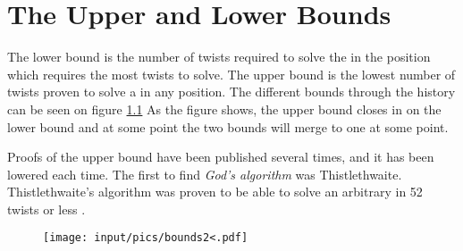 \chapter{The Upper and Lower Bounds}

The lower bound is the number of twists required to solve the \rubik{} in the position which requires the most twists to solve.
The upper bound is the lowest number of twists proven to solve a \rubik{} in any position.
The different bounds through the history can be seen on figure \ref{fig:upperLowerBound}
As the figure shows, the upper bound closes in on the lower bound and at some point the two bounds will merge to one at some point.

Proofs of the upper bound have been published several times, and it has been lowered each time.
The first to find \textit{God's algorithm} was Thistlethwaite. Thistlethwaite's algorithm was proven to be able to solve an arbitrary \rubik{} in 52 twists or less \cite{jaapthistle}.

\begin{comment}
A major breakthrough was when Thistlethwaite's algorithm was proven to be able to solve an arbitrary \rubik{} in 52 twists or less \cite{jaapthistle}.
Since then a lot of progress has been made in the field.
This section describes this progression.
\end{comment}

\begin{figure}[ht]
	\centering
		\texttt{[image: input/pics/bounds2<.pdf]}
	\caption{}
	\label{fig:upperLowerBound}
\end{figure}




